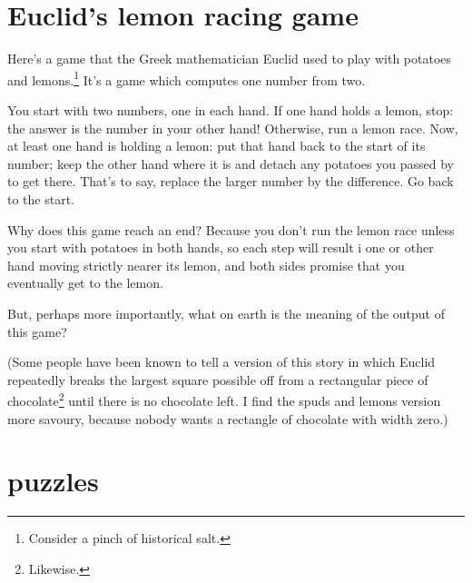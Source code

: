 \documentclass{book}
\begin{document}
\section{Euclid's lemon racing game}

Here's a game that the Greek mathematician Euclid used to play with potatoes and lemons.\footnote{Consider a pinch of historical salt.} It's a game which computes one number from two.

You start with two numbers, one in each hand. If one hand holds a lemon, stop: the answer is the number in your other hand! Otherwise, run a lemon race. Now, at least one hand is holding a lemon: put that hand back to the start of its number; keep the other hand where it is and detach any potatoes you passed by to get there. That's to say, replace the larger number by the difference. Go back to the start.

Why does this game reach an end? Because you don't run the lemon race unless you start with potatoes in both hands, so each step will result i one or other hand moving strictly nearer its lemon, and both sides promise that you eventually get to the lemon.

But, perhaps more importantly, what on earth is the meaning of the output of this game?

(Some people have been known to tell a version of this story in which Euclid repeatedly breaks the largest square possible off from a rectangular piece of chocolate\footnote{Likewise.} until there is no chocolate left. I find the spuds and lemons version more savoury, because nobody wants a rectangle of chocolate with width zero.)


\section{puzzles}
\end{document}

